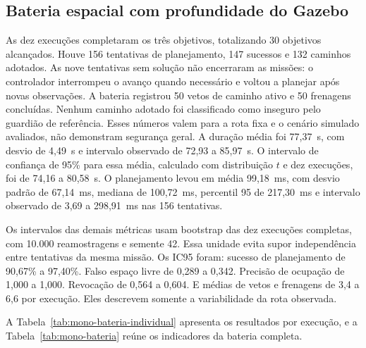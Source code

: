 \subsection{Bateria espacial com profundidade do Gazebo}

As dez execuções completaram os três objetivos, totalizando 30 objetivos alcançados. Houve 156 tentativas de planejamento, 147 sucessos e 132 caminhos adotados. As nove tentativas sem solução não encerraram as missões: o controlador interrompeu o avanço quando necessário e voltou a planejar após novas observações. A bateria registrou 50 vetos de caminho ativo e 50 frenagens concluídas. Nenhum caminho adotado foi classificado como inseguro pelo guardião de referência. Esses números valem para a rota fixa e o cenário simulado avaliados, não demonstram segurança geral. A duração média foi 77,37~s, com desvio de 4,49~s e intervalo observado de 72,93 a 85,97~s. O intervalo de confiança de 95\% para essa média, calculado com distribuição $t$ e dez execuções, foi de 74,16 a 80,58~s. O planejamento levou em média 99,18~ms, com desvio padrão de 67,14~ms, mediana de 100,72~ms, percentil 95 de 217,30~ms e intervalo observado de 3,69 a 298,91~ms nas 156 tentativas.

Os intervalos das demais métricas usam bootstrap das dez execuções completas, com 10.000 reamostragens e semente 42. Essa unidade evita supor independência entre tentativas da mesma missão. Os IC95 foram: sucesso de planejamento de 90,67\% a 97,40\%. Falso espaço livre de 0,289 a 0,342. Precisão de ocupação de 1,000 a 1,000. Revocação de 0,564 a 0,604. E médias de vetos e frenagens de 3,4 a 6,6 por execução. Eles descrevem somente a variabilidade da rota observada.

A Tabela~\ref{tab:mono-bateria-individual} apresenta os resultados por execução, e a Tabela~\ref{tab:mono-bateria} reúne os indicadores da bateria completa.

